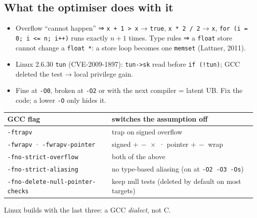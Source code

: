 \documentclass[8pt]{extarticle}
\newcommand\ct[1]{\texttt{#1}}
\newcommand\pa{\mbox{-}\mbox{>}}  %
\begin{document}
\begin{multicols}{2}
\section{What the optimiser does with it}
\begin{itemize}
  \item Overflow ``cannot happen'' ⇒ \ct{x + 1 > x} → \ct{true}, \ct{x * 2 / 2} → \ct{x},
        \ct{for (i = 0; i <= n; i++)} runs exactly $n{+}1$ times. Type rules ⇒ a \ct{float} store
        cannot change a \ct{float *}: a store loop becomes one \ct{memset} (Lattner, 2011).
  \item Linux 2.6.30 \ct{tun} (CVE-2009-1897): \ct{tun\pa{}sk} read before \ct{if (!tun)}; GCC
        deleted the test → local privilege gain.
  \item Fine at \ct{-O0}, broken at \ct{-O2} or with the next compiler = latent UB. Fix the code;
        a lower \ct{-O} only hides it.
\end{itemize}
{\scriptsize\setlength{\tabcolsep}{2pt}
\begin{tabular}{@{}L{31mm}L{46mm}@{}}
\toprule
\textbf{GCC flag} & \textbf{switches the assumption off}\\ \midrule
\ct{-ftrapv} & trap on signed overflow\\
\ct{-fwrapv} · \ct{-fwrapv-pointer} & signed $+\,-\,\times$ · pointer $+\,-$ wrap\\
\ct{-fno-strict-overflow} & both of the above\\
\ct{-fno-strict-aliasing} & no type-based aliasing (on at \ct{-O2 -O3 -Os})\\
\ct{-fno-delete-null-pointer-checks} & keep null tests (deleted by default on most targets)\\
\bottomrule
\end{tabular}}\par
Linux builds with the last three: a GCC \emph{dialect}, not C.


\end{multicols}
\end{document}
